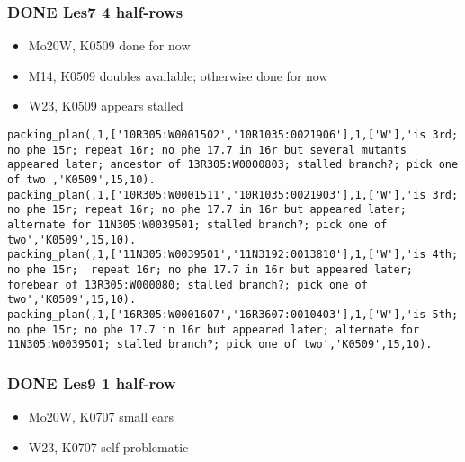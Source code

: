 \documentclass[11pt]{article}
\begin{document}
\subsubsection{{\bfseries\sffamily DONE} Les7 4 half-rows}
\label{sec-4-5-4}

\begin{itemize}
\item Mo20W, K0509 done for now

\item M14, K0509 doubles available; otherwise done for now

\item W23, K0509 appears stalled
\end{itemize}

\begin{verbatim}
packing_plan(,1,['10R305:W0001502','10R1035:0021906'],1,['W'],'is 3rd; no phe 15r; repeat 16r; no phe 17.7 in 16r but several mutants appeared later; ancestor of 13R305:W0000803; stalled branch?; pick one of two','K0509',15,10).
packing_plan(,1,['10R305:W0001511','10R1035:0021903'],1,['W'],'is 3rd; no phe 15r; repeat 16r; no phe 17.7 in 16r but appeared later; alternate for 11N305:W0039501; stalled branch?; pick one of two','K0509',15,10).
packing_plan(,1,['11N305:W0039501','11N3192:0013810'],1,['W'],'is 4th; no phe 15r;  repeat 16r; no phe 17.7 in 16r but appeared later; forebear of 13R305:W000080; stalled branch?; pick one of two','K0509',15,10).
packing_plan(,1,['16R305:W0001607','16R3607:0010403'],1,['W'],'is 5th; no phe 15r; no phe 17.7 in 16r but appeared later; alternate for 11N305:W0039501; stalled branch?; pick one of two','K0509',15,10).
\end{verbatim}














\subsubsection{{\bfseries\sffamily DONE} Les9 1 half-row}
\label{sec-4-5-5}


\begin{itemize}
\item Mo20W, K0707 small ears

\item W23, K0707 self problematic
\end{itemize}
\end{document}
